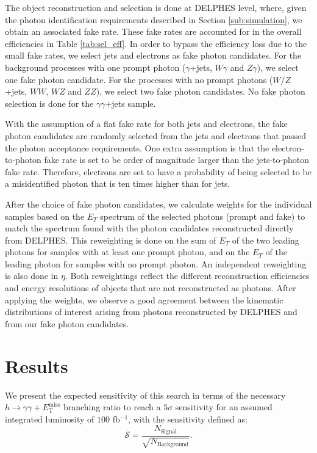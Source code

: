\documentclass[11pt]{article}
\newcommand{\MET}{\ensuremath{E_{\mathrm{T}}^{\mathrm{miss}}}\xspace}
\begin{document}
The object reconstruction and selection is done at DELPHES level, where, given the photon identification requirements described in Section \ref{sub:simulation}, we obtain an associated fake rate. These fake rates are accounted for in the overall efficiencies in Table \ref{tab:sel_eff}. In order to bypass the efficiency loss due to the small fake rates, we select jets and electrons as fake photon candidates. For the background processes with one prompt photon ($\gamma$+jets, $W\gamma$ and $Z\gamma$), we select one fake photon candidate. For the processes with no prompt photons ($W/Z$+jets, $WW$, $WZ$ and $ZZ$), we select two fake photon candidates. No fake photon selection is done for the $\gamma\gamma$+jets sample.

With the assumption of a flat fake rate for both jets and electrons, the fake photon candidates are randomly selected from the jets and electrons that passed the photon acceptance requirements. One extra assumption is that the electron-to-photon fake rate is set to be order of magnitude larger than the jets-to-photon fake rate. Therefore, electrons are set to have a probability of being selected to be a misidentified photon that is ten times higher than for jets.

After the choice of fake photon candidates, we calculate weights for the individual samples based on the $E_{T}$ spectrum of the selected photons (prompt and fake) to match the spectrum found with the photon candidates reconstructed directly from DELPHES. This reweighting is done on the sum of $E_{T}$ of the two leading photons for samples with at least one prompt photon, and on the $E_{T}$ of the leading photon for samples with no prompt photon. An independent reweighting is also done in $\eta$. Both reweightings reflect the different reconstruction efficiencies and energy resolutions of objects that are not reconstructed as photons. After applying the weights, we observe a good agreement between the kinematic distributions of interest arising from photons reconstructed by DELPHES and from our fake photon candidates.

\section{Results}

We present the expected sensitivity of this search in terms of the necessary $h\rightarrow\gamma\gamma+\MET$ branching ratio to reach a $5\sigma$ sensitivity for an assumed integrated luminosity of $100$ fb$^{-1}$, with the sensitivity defined as:
%
\begin{equation}
\mathcal{S} = \frac{N_\text{Signal}}{\sqrt{N_\text{Background}}}.
\end{equation}
\end{document}

